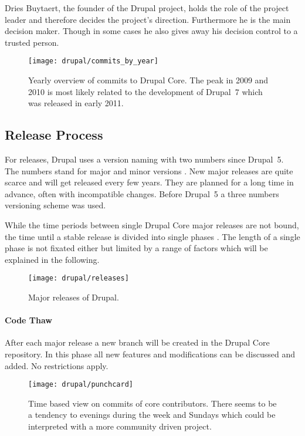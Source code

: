 Dries Buytaert, the founder of the Drupal project, holds the role of the
project leader and therefore decides the project's direction. Furthermore he is
the main decision maker. Though in some cases he also gives away his decision
control to a trusted person.

\begin{figure}[htbp]
  \centering
  \texttt{[image: drupal/commits\_by\_year]}
  \caption[Commits by year, Drupal]
  {Yearly overview of commits to Drupal Core. The peak in 2009 and 2010 is most
    likely related to the development of Drupal~7 which was released in early
    2011.}
\end{figure}


\subsection{Release Process} %

For releases, Drupal uses a version naming with two numbers since Drupal~5. The
numbers stand for major and minor versions \cite{DrupalUpgrade}. New major
releases are quite scarce and will get released every few years. They are
planned for a long time in advance, often with incompatible changes. Before
Drupal~5 a three numbers versioning scheme was used.

While the time periods between single Drupal Core major releases are not bound,
the time until a stable release is divided into single phases
\cite{DrupalReleaseCycle}. The length of a single phase is not fixated either
but limited by a range of factors which will be explained in the following.

\begin{figure}[htbp]
  \centering
  \texttt{[image: drupal/releases]}
  \caption[Major releases of Drupal]{Major releases of Drupal.}
\end{figure}

\paragraph{Code Thaw}

After each major release a new branch will be created in the Drupal Core
repository. In this phase all new features and modifications can be discussed
and added. No restrictions apply.

\begin{figure}[htbp]
  \centering
  \texttt{[image: drupal/punchcard]}
  \caption[Time based view on commits, Drupal]
  {Time based view on commits of core contributors. There seems to be a
    tendency to evenings during the week and Sundays which could be interpreted
    with a more community driven project.}
\end{figure}

